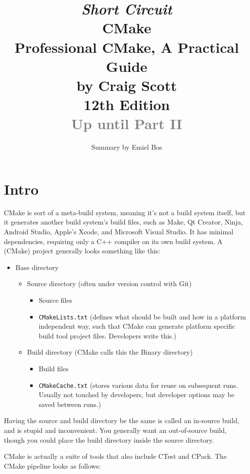 \documentclass[table, xcdraw]{article}%
\title{
\textit{Short Circuit}\\
\vspace{15px}
\huge
CMake\\
\vspace{20px}
\large
Professional CMake, A Practical Guide\\
by Craig Scott\\
12th Edition\\
\textcolor{gray}{Up until Part II}
}
\author{Summary by Emiel Bos}
\date{}
\begin{document}
\maketitle

\section{Intro}

CMake is sort of a meta-build system, meaning it's not a build system itself, but it generates another build system's build files, such as Make, Qt Creator, Ninja, Android Studio, Apple's Xcode, and Microsoft Visual Studio. It has minimal dependencies, requiring only a C++ compiler on its own build system. A (CMake) project generally looks something like this:

\begin{itemize}
    \item Base directory
    \begin{itemize}
        \item Source directory (often under version control with Git)
        \begin{itemize}
            \item Source files
            \item \texttt{CMakeLists.txt} (defines what should be built and how in a platform independent way, such that CMake can generate platform specific build tool project files. Developers write this.)
        \end{itemize}
        \item Build directory (CMake calls this the Binary directory)
        \begin{itemize}
            \item Build files
            \item \texttt{CMakeCache.txt} (stores various data for reuse on subsequent runs. Usually not touched by developers, but developer options may be saved between runs.)
        \end{itemize}
    \end{itemize}
\end{itemize}

Having the source and build directory be the same is called an in-source build, and is stupid and inconvenient. You generally want an out-of-source build, though you could place the build directory inside the source directory.

CMake is actually a suite of tools that also include CTest and CPack. The CMake pipeline looks as follows:
\end{document}
